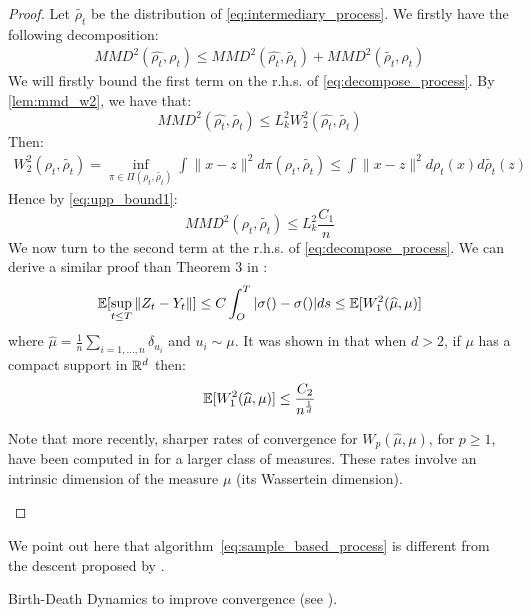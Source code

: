 \begin{proof}
		
	\vspace{2cm}
	Let $\widetilde{\rho_t}$ be the distribution of \eqref{eq:intermediary_process}. We firstly have the following decomposition:
	\begin{align}\label{eq:decompose_process}
	MMD^2(\widehat{\rho_t}, \rho_t) \le MMD^2(\widehat{\rho_t}, \widetilde{\rho_t})+ MMD^2(\widetilde{\rho_t}, \rho_t)
	\end{align}
	 We will firstly bound the first term on the r.h.s. of \eqref{eq:decompose_process}. By \cref{lem:mmd_w2}, we have that:
	 \begin{equation}
	 MMD^2(\widehat{\rho_t}, \widetilde{\rho_t})\le L_k^2 W_2^2(\widehat{\rho_t}, \widetilde{\rho_t})
	 \end{equation}
	 Then:
	 \begin{align}
	 W_2^2(\rho_t, \widetilde{\rho_t}) = \inf_{\pi \in \Pi(\rho_t, \widetilde{\rho_t})} \int \| x-z \|^2 d\pi(\rho_t, \widetilde{\rho_t}) \le \int \|x-z\|^2 d\rho_t(x)d\widetilde{\rho_t}(z)
	 \end{align}
	 Hence by \eqref{eq:upp_bound1}:
	 \begin{equation}
	 MMD^2(\rho_t, \widetilde{\rho_t})\le L_k^2 \frac{C_1}{n}
	 \end{equation}
	We now turn to the second term at the r.h.s. of \eqref{eq:decompose_process}. We can derive a similar proof than Theorem 3 in \cite{jourdain2007nonlinear}:
	 \begin{align}
	 {{\mathbb E}}[\sup_{t\le T}\|Z_t-Y_t\|] \le   C \int_{O}^T |\sigma() -\sigma()| ds \le {{\mathbb E}}[W_1^2(\widehat{\mu},\mu)]
	 \end{align}
	where $\widehat{\mu}=\frac{1}{n}\sum_{i=1, \dots,n}\delta_{u_i}$ and $u_i \sim \mu$. It was shown in \cite{dudley1969speed} that when $d > 2$, if $\mu$ has a compact support in ${{\mathbb R}}^d$ then:
	\begin{equation}
		{{\mathbb E}}[W_1^2(\widehat{\mu},\mu)]\le \frac{C_2}{n^{\frac{1}{d}}}
	\end{equation}
	\begin{remark}
	Note that more recently, sharper rates of convergence  for $W_p(\widehat{ \mu}, \mu)$, for $p\ge 1$, have been computed in \cite{weed2017sharp} for a larger class of measures. These rates involve an intrinsic dimension of the measure $\mu$ (its Wassertein dimension). 
	\end{remark}
\end{proof}


\begin{remark}
	We point out here that algorithm~\eqref{eq:sample_based_process} is different from the descent proposed by \cite{mroueh2018regularized}. 
\end{remark}

\begin{remark}
	Birth-Death Dynamics to improve convergence (see \cite{rotskoff2019global}).
\end{remark}
